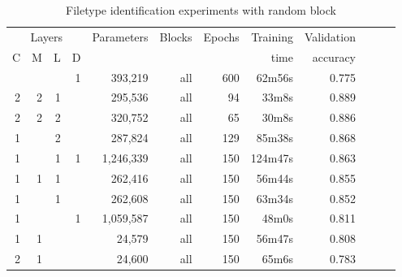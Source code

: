 \begin{table}[!ht]
    \centering
    \caption{Filetype identification experiments with random block}
    \label{tab:carving12-27}
\begin{tabular}{|r|r|r|r|r|r|r|r|r|r|r|r|}
\hline
\multicolumn{4}{|c|}{Layers} 
              & Parameters & Blocks & Epochs & Training   & Validation \\ \cline{1-4}
C & M & L & D &            &        &        & time       & accuracy   \\ \hline
   
  &   &   & 1 & 393,219    & all    & 600    & 62m56s     & 0.775 \\ \hline
2 & 2 & 1 &   & 295,536    & all    & 94     & 33m8s      & 0.889 \\ \hline
2 & 2 & 2 &   & 320,752    & all    & 65     & 30m8s      & 0.886 \\ \hline
1 &   & 2 &   & 287,824    & all    & 129    & 85m38s     & 0.868 \\ \hline
1 &   & 1 & 1 & 1,246,339  & all    & 150    & 124m47s    & 0.863 \\ \hline
1 & 1 & 1 &   & 262,416    & all    & 150    & 56m44s     & 0.855 \\ \hline
1 &   & 1 &   & 262,608    & all    & 150    & 63m34s     & 0.852 \\ \hline   
1 &   &   & 1 & 1,059,587  & all    & 150    & 48m0s      & 0.811 \\ \hline
1 & 1 &   &   & 24,579     & all    & 150    & 56m47s     & 0.808 \\ \hline
2 & 1 &   &   & 24,600     & all    & 150    & 65m6s      & 0.783 \\ \hline 
   

\end{tabular}
\end{table}
